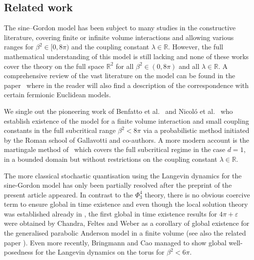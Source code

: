 \documentclass[11pt, a4paper]{scrartcl}
\numberwithin{equation}{section}
\theoremstyle{plain}
\theoremstyle{remark}
\begin{document}
\subsection{Related work}

The sine--Gordon model has been subject to many studies in the constructive
literature, covering finite or infinite volume interactions and allowing
various ranges for $\beta^2 \in [0, 8 \pi)$ and the coupling constant $\lambda
\in \mathbb{R}$. However, the full mathematical understanding of this model is
still lacking and none of these works cover the theory on the full space
$\mathbb{R}^2$ for all $\beta^2 \in (0, 8 \pi)$ and all $\lambda \in
\mathbb{R}$. A comprehensive review of the vast literature on the model can be found in the
paper~{\cite{bauerschmidtColemanCorrespondenceFree2023}} where in the reader
will also find a description of the correspondence with certain fermionic
Euclidean models.

We single out the pioneering work of Benfatto et
al.~{\cite{benfattoMassiveSineGordonEquation1982}} and Nicol{\'o} et
al.~{\cite{nicoloMassiveSineGordonEquation1986}} who establish existence of
the model for a finite volume interaction and small coupling constants in the
full subcritical range $\beta^2 < 8 \pi$ via a probabilistic method initiated
by the Roman school of Gallavotti and co-authors. A more modern account is the
martingale method of~{\cite{lacoinProbabilisticApproachUltraviolet2022}} which
covers the full subcritical regime in the case $d = 1$, in a bounded domain
but without restrictions on the coupling constant $\lambda \in \mathbb{R}$.

The more classical stochastic quantisation using the Langevin dynamics for the
sine-Gordon model has only been partially resolved after the preprint of 
the present article appeared. In contrast to the $\Phi^4_3$ theory, there is no
obvious coercive term to ensure global in time existence and even though the
local solution theory was established already in
\cite{hairerDynamicalSineGordonModel2016,chandraDynamicalSineGordonModel2018}, 
the first global in time existence results for $4\pi+\varepsilon$ were obtained by Chandra, Feltes and 
Weber \cite{chandraPrioriBounds2d2024} as a corollary of global existence for the generalised parabolic Anderson model in a finite volume 
(see also the related paper \cite{shenGlobalWellposedness2D2025}).
Even more recently, Bringmann and Cao \cite{bringmannGlobalWellposednessDynamical2024} 
managed to show global well-posedness for the Langevin dynamics on the torus for $\beta^2<6\pi$.
\end{document}
